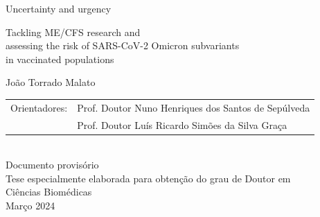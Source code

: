 \begin{center}
    {\FontLb Uncertainty and urgency} \\
    
    \vspace{0.2cm}
    
    {\FontMn Tackling ME/CFS research and\\assessing the risk of SARS-CoV-2 Omicron subvariants\\in vaccinated populations} \\
    
    \vspace{1.2cm}
    
    {\FontMb João Torrado Malato} \\
    
    \vspace{1.2cm}
    {\FontSn %
    \begin{tabular}{ll}
        Orientadores:   & Prof. Doutor Nuno Henriques dos Santos de Sepúlveda \\
                        & Prof. Doutor Luís Ricardo Simões da Silva Graça
    \end{tabular}} \\
    \vspace{1.5cm}
    {\FontSn Documento provisório} \\
    \vspace{0.1cm}
    {\FontSn Tese especialmente elaborada para obtenção do grau de Doutor em} \\
    \vspace{0.2cm}
    {\FontLb Ciências Biomédicas} \\
    \vfill
    {\FontSn Março 2024} \\
\end{center}